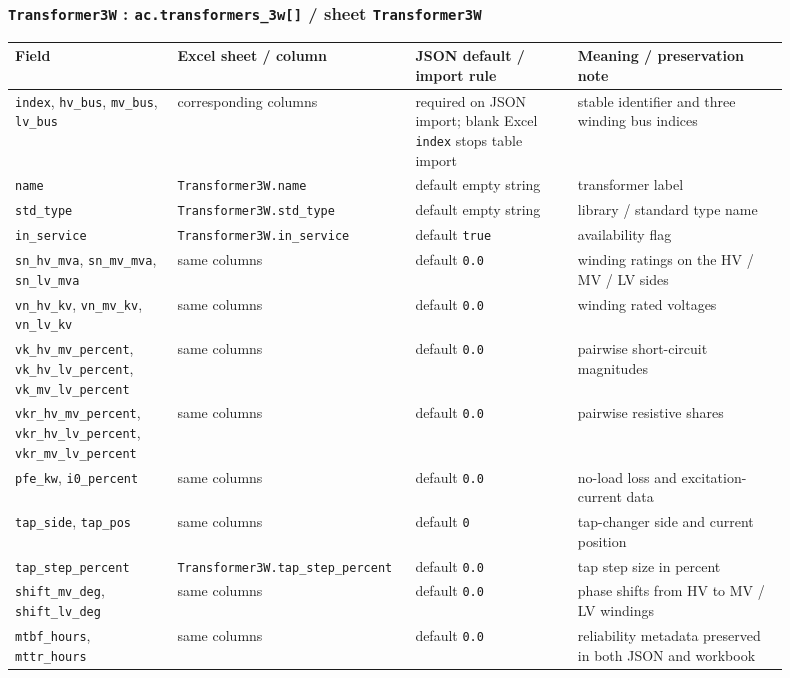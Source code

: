 \subsubsection*{\texttt{Transformer3W} : \texttt{ac.transformers\_3w[]} / sheet \texttt{Transformer3W}}

\begin{longtable}{L{0.20\linewidth}L{0.24\linewidth}L{0.20\linewidth}L{0.26\linewidth}}
\toprule
Field & Excel sheet / column & JSON default / import rule & Meaning / preservation note \\
\midrule
\endhead
\texttt{index}, \texttt{hv\_bus}, \texttt{mv\_bus}, \texttt{lv\_bus} & corresponding columns & required on JSON import; blank Excel \texttt{index} stops table import & stable identifier and three winding bus indices \\
\texttt{name} & \texttt{Transformer3W.name} & default empty string & transformer label \\
\texttt{std\_type} & \texttt{Transformer3W.std\_type} & default empty string & library / standard type name \\
\texttt{in\_service} & \texttt{Transformer3W.in\_service} & default \texttt{true} & availability flag \\
\texttt{sn\_hv\_mva}, \texttt{sn\_mv\_mva}, \texttt{sn\_lv\_mva} & same columns & default \texttt{0.0} & winding ratings on the HV / MV / LV sides \\
\texttt{vn\_hv\_kv}, \texttt{vn\_mv\_kv}, \texttt{vn\_lv\_kv} & same columns & default \texttt{0.0} & winding rated voltages \\
\texttt{vk\_hv\_mv\_percent}, \texttt{vk\_hv\_lv\_percent}, \texttt{vk\_mv\_lv\_percent} & same columns & default \texttt{0.0} & pairwise short-circuit magnitudes \\
\texttt{vkr\_hv\_mv\_percent}, \texttt{vkr\_hv\_lv\_percent}, \texttt{vkr\_mv\_lv\_percent} & same columns & default \texttt{0.0} & pairwise resistive shares \\
\texttt{pfe\_kw}, \texttt{i0\_percent} & same columns & default \texttt{0.0} & no-load loss and excitation-current data \\
\texttt{tap\_side}, \texttt{tap\_pos} & same columns & default \texttt{0} & tap-changer side and current position \\
\texttt{tap\_step\_percent} & \texttt{Transformer3W.tap\_step\_percent} & default \texttt{0.0} & tap step size in percent \\
\texttt{shift\_mv\_deg}, \texttt{shift\_lv\_deg} & same columns & default \texttt{0.0} & phase shifts from HV to MV / LV windings \\
\texttt{mtbf\_hours}, \texttt{mttr\_hours} & same columns & default \texttt{0.0} & reliability metadata preserved in both JSON and workbook \\
\bottomrule
\end{longtable}

